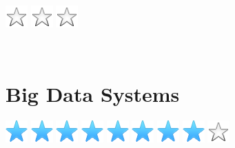 \documentclass[]{cv-class}
\begin{document}
\begin{aside}
{    \includegraphics[scale=0.30]{img/star_empty.png}
    \includegraphics[scale=0.30]{img/star_empty.png}
    \includegraphics[scale=0.30]{img/star_empty.png}}
   
        ~
        \section{Big Data Systems}
    {\includegraphics[scale=0.30]{img/star.png}
    \includegraphics[scale=0.30]{img/star.png}
    \includegraphics[scale=0.30]{img/star.png}
    \includegraphics[scale=0.30]{img/star.png}
    \includegraphics[scale=0.30]{img/star.png}}
    {\includegraphics[scale=0.30]{img/star.png}
    \includegraphics[scale=0.30]{img/star.png}
    \includegraphics[scale=0.30]{img/star.png}
    \includegraphics[scale=0.30]{img/star_empty.png}
}
\end{aside}
\end{document}
